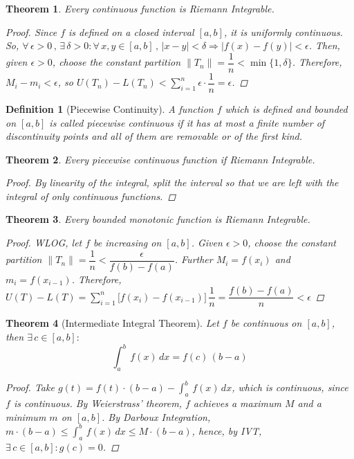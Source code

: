 \documentclass[12pt]{article}
\let\RA\Rightarrow
\newcommand{\Forall}[1]{\forall\,{#1}\,,\,}
\newcommand{\Exist}[1]{\exists\,{#1}:}
\newtheorem{theorem}{Theorem}[subsection]
\newtheorem{definition}{Definition}[subsection]
\begin{document}
\begin{theorem}
  Every continuous function is Riemann Integrable.
  \begin{proof}
    Since $f$ is defined on a closed interval $[a,b]$, it is uniformly continuous. So, $\Forall{\epsilon>0}\Exist{\delta>0}\Forall{x,y\in[a,b]}|x-y|<\delta\RA |f(x)-f(y)|<\epsilon$. Then, given $\epsilon>0$, choose the constant partition $\|T_n\|=\dfrac{1}{n}<\min\{1,\delta\}$. Therefore, $M_i-m_i<\epsilon$, so $U(T_n)-L(T_n)<\sum_{i=1}^n \epsilon\cdot\dfrac{1}{n}=\epsilon$.
  \end{proof}
\end{theorem}

\begin{definition}[Piecewise Continuity]
  A function $f$ which is defined and bounded on $[a,b]$ is called piecewise continuous if it has at most a finite number of discontinuity points and all of them are removable or of the first kind.
\end{definition}

\begin{theorem}
  Every piecewise continuous function if Riemann Integrable.
  \begin{proof}
    By linearity of the integral, split the interval so that we are left with the integral of only continuous functions.
  \end{proof}
\end{theorem}

\begin{theorem}
  Every bounded monotonic function is Riemann Integrable.
  \begin{proof}
    WLOG, let $f$ be increasing on $[a,b]$. Given $\epsilon>0$, choose the constant partition $\|T_n\|=\dfrac{1}{n}<\dfrac{\epsilon}{f(b)-f(a)}$. Further $M_i=f(x_i)$ and $m_i=f(x_{i-1})$. Therefore, $\displaystyle U(T)-L(T)=\sum_{i=1}^n\Big[f(x_i)-f(x_{i-1})\Big]\,\dfrac{1}{n}=\dfrac{f(b)-f(a)}{n}<\epsilon$
  \end{proof}
\end{theorem}

\begin{theorem}[Intermediate Integral Theorem]
  Let $f$ be continuous on $[a,b]$, then $\Exist{c \in [a,b]}$ $$\int_a^b\,f(x)\,dx=f(c)\,(b-a)$$
  \begin{proof}
    Take $g(t)=f(t)\cdot(b-a)-\displaystyle\int_a^b\,f(x)\,dx$, which is continuous, since $f$ is continuous. By Weierstrass' theorem, $f$ achieves a maximum $M$ and a minimum $m$ on $[a,b]$. By Darboux Integration, $m\cdot(b-a)\leq \displaystyle\int_a^b\,f(x)\,dx\leq M\cdot(b-a)$, hence, by IVT, $\Exist{c\in[a,b]}g(c)=0$.
  \end{proof}
\end{theorem}
\end{document}
